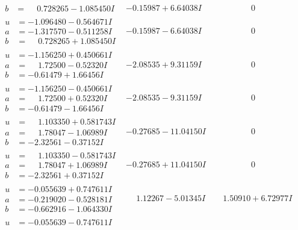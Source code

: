 \documentclass[1p]{elsarticle_modified}
\theoremstyle{definition}
\begin{document}
$$\begin{array}{c|c|c}
\begin{aligned}
b &= \phantom{-}0.728265 - 1.085450 I\end{aligned}
 & -0.15987 + 6.64038 I & \phantom{-0.000000 } 0 \\ \hline\begin{aligned}
u &= -1.096480 - 0.564671 I \\
a &= -1.317570 - 0.511258 I \\
b &= \phantom{-}0.728265 + 1.085450 I\end{aligned}
 & -0.15987 - 6.64038 I & \phantom{-0.000000 } 0 \\ \hline\begin{aligned}
u &= -1.156250 + 0.450661 I \\
a &= \phantom{-}1.72500 - 0.52320 I \\
b &= -0.61479 + 1.66456 I\end{aligned}
 & -2.08535 + 9.31159 I & \phantom{-0.000000 } 0 \\ \hline\begin{aligned}
u &= -1.156250 - 0.450661 I \\
a &= \phantom{-}1.72500 + 0.52320 I \\
b &= -0.61479 - 1.66456 I\end{aligned}
 & -2.08535 - 9.31159 I & \phantom{-0.000000 } 0 \\ \hline\begin{aligned}
u &= \phantom{-}1.103350 + 0.581743 I \\
a &= \phantom{-}1.78047 - 1.06989 I \\
b &= -2.32561 - 0.37152 I\end{aligned}
 & -0.27685 - 11.04150 I & \phantom{-0.000000 } 0 \\ \hline\begin{aligned}
u &= \phantom{-}1.103350 - 0.581743 I \\
a &= \phantom{-}1.78047 + 1.06989 I \\
b &= -2.32561 + 0.37152 I\end{aligned}
 & -0.27685 + 11.04150 I & \phantom{-0.000000 } 0 \\ \hline\begin{aligned}
u &= -0.055639 + 0.747611 I \\
a &= -0.219020 - 0.528181 I \\
b &= -0.662916 - 1.064330 I\end{aligned}
 & \phantom{-}1.12267 - 5.01345 I & \phantom{-}1.50910 + 6.72977 I \\ \hline\begin{aligned}
u &= -0.055639 - 0.747611 I \\

\end{aligned}
\end{array}$$
\end{document}
